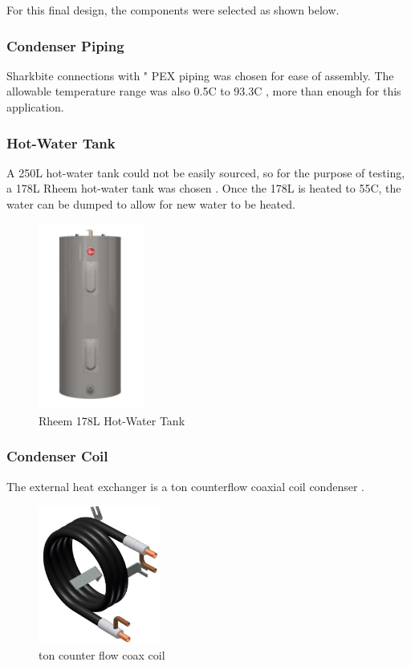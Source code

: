\medskip
For this final design, the components were selected as shown below.

\subsubsection{Condenser Piping}

\medskip
Sharkbite connections with " PEX piping was chosen for ease of assembly. The allowable temperature range was also 0.5\textdegree C to 93.3\textdegree C \cite{pex_tech}, more than enough for this application. 

\subsubsection{Hot-Water Tank}

\medskip
A 250L hot-water tank could not be easily sourced, so for the purpose of testing, a 178L Rheem hot-water tank was chosen \cite{hot_water_tank}. Once the 178L is heated to 55\textdegree C, the water can be dumped to allow for new water to be heated.

\medskip
\begin{figure}[H]
    \centering
    \includegraphics[width=3.5cm]{images/rheem_178L_tank.JPG}
    \caption{Rheem 178L Hot-Water Tank}
\end{figure}

\subsubsection{Condenser Coil}

\medskip
The external heat exchanger is a  ton counterflow coaxial coil condenser \cite{coax_coil}.

\medskip
\begin{figure}[H]
    \centering
    \includegraphics[width=4cm]{images/coax_coil.JPG}
    \caption{ ton counter flow coax coil}
\end{figure}

